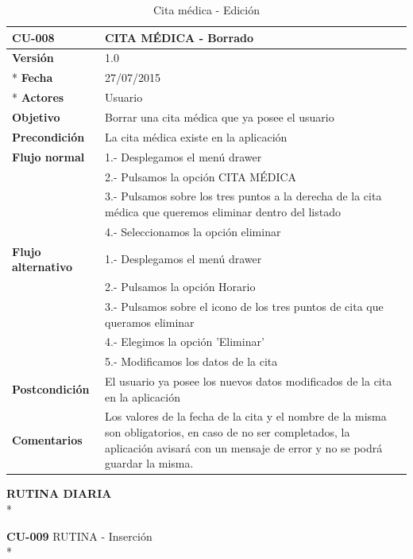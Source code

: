 \documentclass[../pfc.tex]{subfiles}
\begin{document}
		\begin{table}[H]
			\centering
			\begin{tabular}[t]{|p{3cm}|p{9.5cm}|}
				\hline \textbf{CU-008} & \textbf{CITA MÉDICA - Borrado} \\*
				\hline\hline \textbf{Versión} & 1.0 \\ *
				\hline\hline \textbf{Fecha} & 27/07/2015 \\ *
				\hline\textbf{Actores} 	& Usuario\\*
				\hline \textbf{Objetivo} & Borrar una cita médica que ya posee el usuario\\* 			
				\hline \textbf{Precondición} & La cita médica existe en la aplicación\\* 
				\hline \textbf{Flujo normal} & 1.- Desplegamos el menú drawer \\* 
				& 2.- Pulsamos la opción CITA MÉDICA\\*	
				& 3.- Pulsamos sobre los tres puntos a la derecha de la cita médica que queremos eliminar dentro del listado\\*	
				& 4.- Seleccionamos la opción eliminar\\*	
				\hline \textbf{Flujo alternativo} & 1.- Desplegamos el menú drawer \\* 
				& 2.- Pulsamos la opción Horario \\*	
				& 3.- Pulsamos sobre el icono de los tres puntos de cita que queramos eliminar \\*	
				& 4.- Elegimos la opción 'Eliminar'\\*	
				& 5.- Modificamos los datos de la cita\\*	
				\hline \textbf{Postcondición} & El usuario ya posee los nuevos datos modificados de la cita en la aplicación \\* 
				\hline \textbf{Comentarios}   & Los valores de la fecha de la cita y el nombre de la misma son obligatorios, en caso de no ser completados, la aplicación avisará con un mensaje de error y no se podrá guardar la misma.\\*
				\hline
			\end{tabular}
			\caption{Cita médica - Edición}
			\label{tabla:caso008}

		\end{table}

	
	
	\textbf{RUTINA DIARIA}\\*
		
	\textbf{CU-009}	RUTINA - Inserción\\*
		
\end{document}
